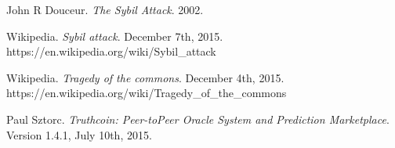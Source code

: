 \documentclass[onecolumn]{article}
\begin{document}
\begin{thebibliography}{9}

	John R Douceur.
	\emph{The Sybil Attack}.
	2002.

	Wikipedia.
	\emph{Sybil attack}.
	December 7th, 2015.
	https://en.wikipedia.org/wiki/Sybil\_attack

	Wikipedia.
	\emph{Tragedy of the commons}.
	December 4th, 2015.
	https://en.wikipedia.org/wiki/Tragedy\_of\_the\_commons

	Paul Sztorc.
	\emph{Truthcoin: Peer-toPeer Oracle System and Prediction Marketplace}.
	Version 1.4.1, July 10th, 2015.

\end{thebibliography}
\end{document}
